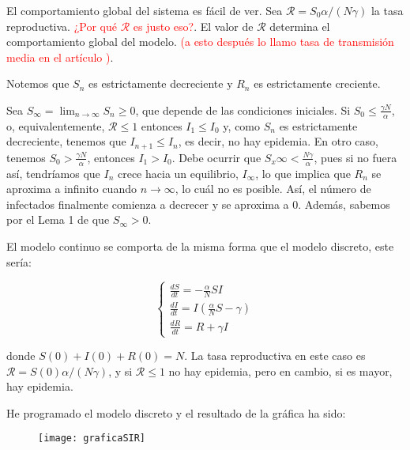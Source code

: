 El comportamiento global del sistema es fácil de ver. Sea $\mathcal{R}=S_0 \alpha/(N\gamma )$ la tasa reproductiva. \textcolor{red}{¿Por qué $\mathcal{R}$ es justo eso?}. El valor de $\mathcal{R}$ determina el comportamiento global del modelo. \textcolor{red}{(a esto después lo llamo tasa de transmisión media en el artículo \cite{demongeotSIEpidemicModel})}. 

Notemos que $S_n$ es estrictamente decreciente y $R_n$ es estrictamente creciente.

Sea $S_\infty=\lim_{n\rightarrow\infty} S_n\geq 0$, que depende de las condiciones iniciales. Si $S_0\leq \frac{\gamma N}{\alpha}$, o, equivalentemente, $\mathcal{R}\leq 1$ entonces $I_1\leq I_0$ y, como $S_n$ es estrictamente decreciente, tenemos que $I_{n+1}\leq I_n$, es decir, no hay epidemia. En otro caso, tenemos $S_0> \frac{\gamma N}{\alpha}$, entonces $I_1>I_0$. Debe ocurrir que $S_x\infty <\frac{N\gamma}{\alpha}$, pues si no fuera así, tendríamos que $I_n$ crece hacia un equilibrio, $I_\infty$, lo que implica que $R_n$ se aproxima a infinito cuando $n\rightarrow\infty$, lo cuál no es posible. Así, el número de infectados finalmente comienza a decrecer y se aproxima a $0$. Además, sabemos por el Lema 1 de \cite{allenDiscretetimeSISIR1994} que $S_\infty>0$.

El modelo continuo se comporta de la misma forma que el modelo discreto, este sería:

\begin{equation}
\label{eqn: modelo_SIR_continuo}
\begin{cases}
\frac{dS}{dt} = -\frac{\alpha}{N}SI \\
\frac{dI}{dt} = I\left(\frac{\alpha}{N}S-\gamma \right) \\
\frac{dR}{dt} = R+\gamma I
\end{cases}
\end{equation}

donde $S(0)+I(0)+R(0)=N$. La tasa reproductiva en este caso es $\mathcal{R}=S(0)\alpha /(N\gamma )$, y si $\mathcal{R}\leq 1$  no hay epidemia, pero en cambio, si es mayor, hay epidemia.

He programado el modelo discreto y el resultado de la gráfica ha sido:

\begin{figure}[H]
\begin{center}
\texttt{[image: graficaSIR]}
\end{center}
\end{figure}






